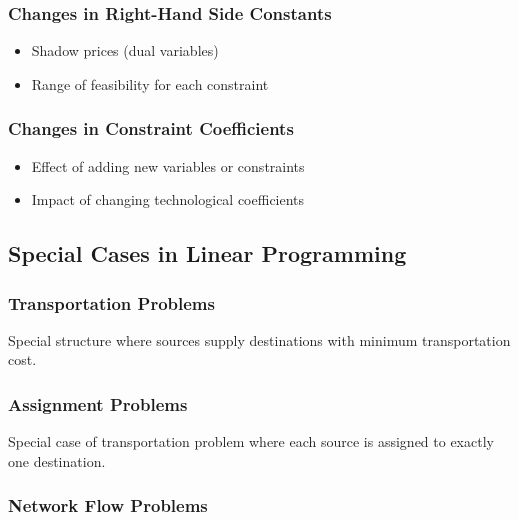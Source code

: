 \documentclass[
  letterpaper,
  DIV=11,
  numbers=noendperiod]{scrreprt}
\providecommand{\tightlist}{%
  \setlength{\itemsep}{0pt}\setlength{\parskip}{0pt}}
\begin{document}
\subsubsection{Changes in Right-Hand Side
Constants}\label{changes-in-right-hand-side-constants}

\begin{itemize}
\tightlist
\item
  Shadow prices (dual variables)
\item
  Range of feasibility for each constraint
\end{itemize}

\subsubsection{Changes in Constraint
Coefficients}\label{changes-in-constraint-coefficients}

\begin{itemize}
\tightlist
\item
  Effect of adding new variables or constraints
\item
  Impact of changing technological coefficients
\end{itemize}

\subsection{Special Cases in Linear
Programming}\label{special-cases-in-linear-programming}

\subsubsection{Transportation Problems}\label{transportation-problems}

Special structure where sources supply destinations with minimum
transportation cost.

\subsubsection{Assignment Problems}\label{assignment-problems}

Special case of transportation problem where each source is assigned to
exactly one destination.

\subsubsection{Network Flow Problems}\label{network-flow-problems}
\end{document}
